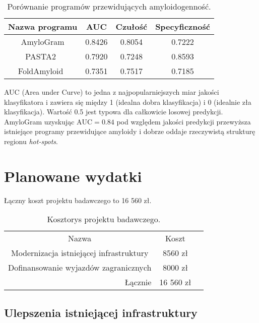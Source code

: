 \documentclass{article}
\begin{document}
\begin{table}[!htbp]
\centering
\caption*{Porównanie programów przewidujących amyloidogenność.} 
\begin{tabular}{c|c|c|c}
  \hline
Nazwa programu & AUC & Czułość & Specyficzność \\ 
  \hline
AmyloGram & 0.8426 & 0.8054 & 0.7222 \\ 
PASTA2~\citep{walsh_pasta_2014} & 0.7920 & 0.7248 & 0.8593 \\ 
  FoldAmyloid~\citep{Garbuzynskiy2010} & 0.7351 & 0.7517 & 0.7185 \\ 
   \hline
\end{tabular}
\end{table}

AUC (Area under Curve) to jedna z najpopularniejszych miar jakości klasyfikatora i zawiera się między 1 (idealna dobra klasyfikacja) i 0 (idealnie zła klasyfikacja). Wartość 0.5 jest typowa dla całkowicie losowej predykcji. AmyloGram uzyskując $\textrm{AUC} = 0.84$ pod względem jakości predykcji przewyższa istniejące programy przewidujące amyloidy i dobrze oddaje rzeczywistą strukturę regionu \textit{hot-spots}.



\section{Planowane wydatki}

Łączny koszt projektu badawczego to 16 560 zł.

\begin{table}[!htbp]
\centering
\caption*{Kosztorys projektu badawczego.}
\begin{tabular}{rrr}
\cline{1-2}
\multicolumn{1}{|c}{Nazwa}                                   & \multicolumn{1}{|c|}{Koszt}   &  \\ \cline{1-2}
\multicolumn{1}{|c}{Modernizacja istniejącej infrastruktury} & \multicolumn{1}{|c|}{8560 zł} &  \\ \cline{1-2}
\multicolumn{1}{|c}{Dofinansowanie wyjazdów zagranicznych}   & \multicolumn{1}{|c|}{8000 zł} &  \\ \cline{1-2}
Łącznie    & 16 560 zł                    & 
\end{tabular}
\end{table}

\subsection{Ulepszenia istniejącej infrastruktury}
\end{document}
